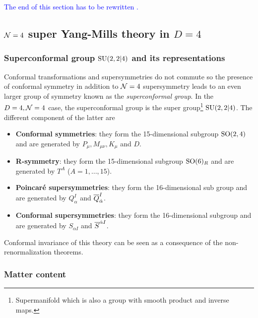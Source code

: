         \textcolor{blue}{The end of this section has to be rewritten \marker.}
    
    \subsection{$\mathcal{N}=4$ super Yang-Mills theory in $D=4$}\label{sec:N4SCFT}

        \subsubsection{Superconformal group $\text{SU}(2,2|4)$ and its representations}

            Conformal transformations and supersymmetries do not commute so the presence of conformal symmetry in addition to $\mathcal{N}=4$ supersymmetry leads to an even larger group of symmetry known as the \emph{superconformal group}. In the $D=4,\mathcal{N}=4$ case, the superconformal group is the super group\footnote{Supermanifold which is also a group with smooth product and inverse maps.} $\text{SU}(2,2|4)$. The different component of the latter are
            \begin{itemize}
                \item \textbf{Conformal symmetries}: they form the 15-dimensional subgroup $\text{SO}(2,4)$ and are generated by $P_\mu,M_{\mu\nu},K_\mu$ and $D$.
                \item \textbf{R-symmetry}: they form the 15-dimensional subgroup $\text{SO}(6)_R$ and are generated by $T^A$ ($A=1,\dots,15$).
                \item \textbf{Poincaré supersymmetries}: they form the 16-dimensional sub group \marker and are generated by $Q^I_\alpha$ and $\overline{Q}^I_{\dot{\alpha}}$.
                \item \textbf{Conformal supersymmetries}: they form the 16-dimensional subgroup \marker and are generated by $S_{\alpha I}$ and $\overline{S}^{\dot{\alpha} I}$.
            \end{itemize}

            Conformal invariance of this theory can be seen as a consequence of the non-renormalization theorems.

        \subsubsection{Matter content}
            
